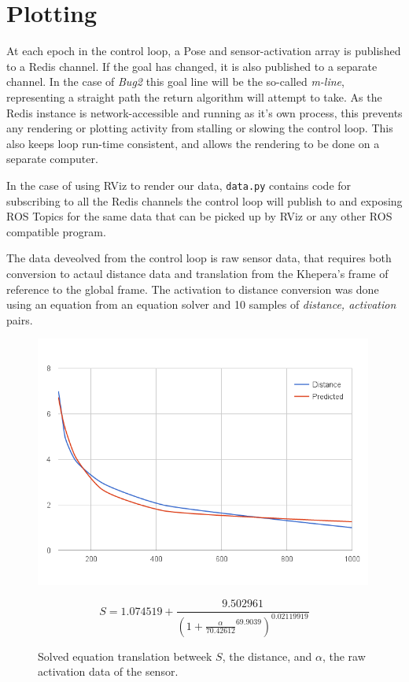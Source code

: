 \documentclass[11pt, a4paper]{article}
\begin{document}

\newpage
\section{Plotting}
\label{Plotting}

At each epoch in the control loop, a Pose and sensor-activation array is published to a Redis channel.
If the goal has changed, it is also published to a separate channel. 
In the case of \textit{Bug2} this goal line will be the so-called \textit{m-line}, representing a 
straight path the return algorithm will attempt to take. As the Redis instance is network-accessible 
and running as it's own process, this prevents any rendering or plotting activity from stalling or 
slowing the control loop. This also keeps loop run-time consistent, and allows the rendering to
be done on a separate computer.

In the case of using RViz to render our data, \texttt{data.py} contains code for 
subscribing to all the Redis channels the control loop will publish to and exposing 
ROS Topics for the same data that can be picked up by RViz or any other ROS compatible 
program.

The data deveolved from the control loop is raw sensor data, that requires both conversion to
actaul distance data and translation from the Khepera's frame of reference to the global frame.
The activation to distance conversion was done using an equation from an equation solver and 10
samples of \textit{distance, activation} pairs.

\begin{figure}[h]
  \begin{center}
    \includegraphics[width=30em]{../assets/plots/sensor-equation.png}
  \end{center}
  \begin{equation}
    S = 1.074519 + 
    \frac{9.502961}
         {(1 + \frac{\alpha}{70.42612}^{69.9039})^{0.02119919}}
  \end{equation}
  \caption{Solved equation translation betweek $S$, the distance, and $\alpha$, 
    the raw activation data of the sensor.}
\end{figure}
\end{document}

